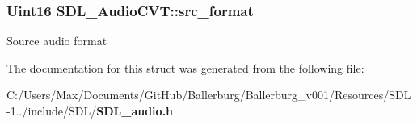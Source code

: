 \subsubsection[{src\+\_\+format}]{\setlength{\rightskip}{0pt plus 5cm}Uint16 S\+D\+L\+\_\+\+Audio\+C\+V\+T\+::src\+\_\+format}\label{struct_s_d_l___audio_c_v_t_a06215f053474c02d9292b6c317af435c}
Source audio format 

The documentation for this struct was generated from the following file\+:\begin{DoxyCompactItemize}
\item 
C\+:/\+Users/\+Max/\+Documents/\+Git\+Hub/\+Ballerburg/\+Ballerburg\+\_\+v001/\+Resources/\+S\+D\+L-\/1../include/\+S\+D\+L/{\bf S\+D\+L\+\_\+audio.\+h}\end{DoxyCompactItemize}
